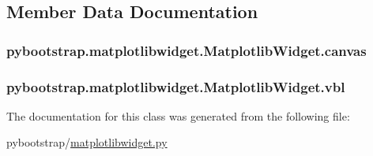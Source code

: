 \subsection{Member Data Documentation}
\hypertarget{classpybootstrap_1_1matplotlibwidget_1_1MatplotlibWidget_a442e18eb0a49800cbf5866cf23ca1bef}{
\subsubsection[{canvas}]{\setlength{\rightskip}{0pt plus 5cm}pybootstrap.\-matplotlibwidget.\-Matplotlib\-Widget.\-canvas}}\label{classpybootstrap_1_1matplotlibwidget_1_1MatplotlibWidget_a442e18eb0a49800cbf5866cf23ca1bef}
\hypertarget{classpybootstrap_1_1matplotlibwidget_1_1MatplotlibWidget_afe4b84db71c83e50dbb1b4a911ade784}{
\subsubsection[{vbl}]{\setlength{\rightskip}{0pt plus 5cm}pybootstrap.\-matplotlibwidget.\-Matplotlib\-Widget.\-vbl}}\label{classpybootstrap_1_1matplotlibwidget_1_1MatplotlibWidget_afe4b84db71c83e50dbb1b4a911ade784}


The documentation for this class was generated from the following file\-:\begin{DoxyCompactItemize}
\item 
pybootstrap/\hyperlink{matplotlibwidget_8py}{matplotlibwidget.\-py}\end{DoxyCompactItemize}

